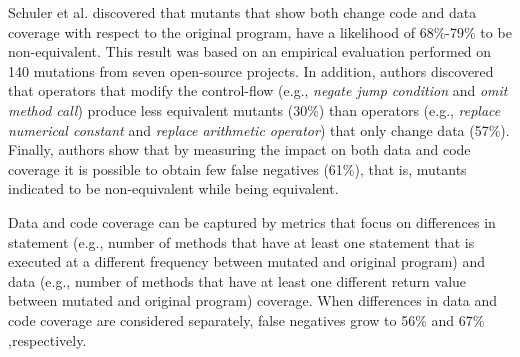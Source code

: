 Schuler et al. \cite{schuler2010covering,schuler2013covering} discovered that mutants that show both change code and data coverage with respect to the original program, have a likelihood of 68\%-79\% to be non-equivalent.
This result was based on an empirical evaluation performed on 140 mutations from seven open-source projects.
In addition, authors discovered that operators that modify the control-flow (e.g., \textit{negate jump condition} and \textit{omit method call}) produce less equivalent mutants (30\%) 
than operators (e.g., \textit{replace numerical constant} and \textit{replace arithmetic operator}) that only change data (57\%).
Finally, 
 authors show that by measuring the impact on both data and code coverage it is possible to obtain few false negatives (61\%), that is, mutants indicated to be non-equivalent while being equivalent. 

Data and code coverage can be captured by metrics that focus on differences in statement (e.g., number of methods that have at least one statement that is executed at a different frequency between mutated and original program) and data (e.g., number of methods that have at least one different return value between mutated and original program) coverage. 
When differences in data and code coverage are considered separately, false negatives grow to 56\% and 67\% ,respectively.

